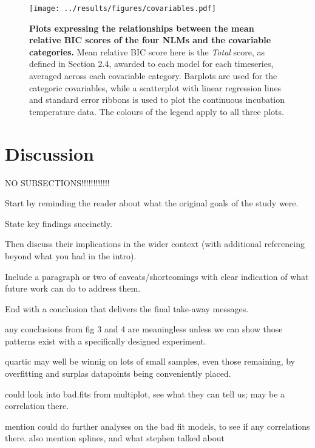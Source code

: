 \documentclass[11pt]{article}
\begin{document}
\begin{figure*}
    \centering
    \texttt{[image: ../results/figures/covariables.pdf]} %
    \caption{\textbf{Plots expressing the relationships between the mean relative BIC scores of the four NLMs and the covariable categories.}  Mean relative BIC score here is the \textit{Total} score, as defined in Section 2.4, awarded to each model for each timeseries, averaged across each covariable category. Barplots are used for the categoric covariables, while a scatterplot with linear regression lines and standard error ribbons is used to plot the continuous incubation temperature data. The colours of the legend apply to all three plots.}
\end{figure*}





\newpage


\section{Discussion}%

NO SUBSECTIONS!!!!!!!!!!!!



Start by reminding the reader about what the original goals of the study were.

State key findings succinctly.

Then discuss their implications in the wider context (with additional referencing beyond what you had in the intro).

Include a paragraph or two of caveats/shortcomings with clear indication of what future work can do to address them.

End with a conclusion that delivers the final take-away messages.

any conclusions from fig 3 and 4 are meaningless unless we can show those patterns exist with a specifically designed experiment.


quartic may well be winnig on lots of small samples, even those remaining, by overfitting and surplas datapoints being conveniently placed.

could look into bad.fits from multiplot, see what they can tell us; may be a correlation there.

mention could do further analyses on the bad fit models, to see if any correlations there. also mention splines, and what stephen talked about
\end{document}
